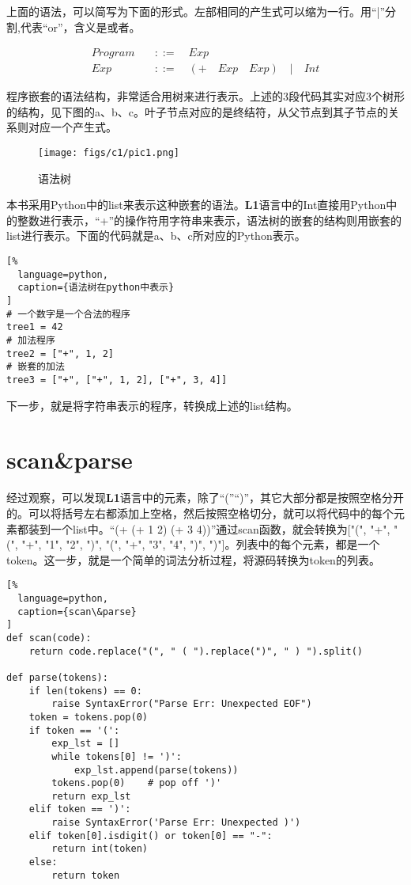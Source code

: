 上面的语法，可以简写为下面的形式。左部相同的产生式可以缩为一行。用“|”分割,代表“or”，含义是或者。

\begin{equation}
\begin{aligned}
  \label{eq:2}
   Program \quad &::= \quad Exp \\
   Exp \quad &::= \quad (+ \quad Exp \quad Exp) \quad | \quad Int
\end{aligned}
\end{equation}

程序嵌套的语法结构，非常适合用树来进行表示。上述的3段代码其实对应3个树形的结构，见下图的a、b、c。叶子节点对应的是终结符，从父节点到其子节点的关系则对应一个产生式。

\begin{figure}[ht]
\centering
\texttt{[image: figs/c1/pic1.png]}
\caption{语法树}
\label{fig:fig1}
\end{figure}

本书采用Python中的list来表示这种嵌套的语法。\textbf{L1}语言中的Int直接用Python中的整数进行表示，“+”的操作符用字符串来表示，语法树的嵌套的结构则用嵌套的list进行表示。下面的代码就是a、b、c所对应的Python表示。

\begin{lstlisting}[%
  language=python,
  caption={语法树在python中表示}
]
# 一个数字是一个合法的程序
tree1 = 42
# 加法程序
tree2 = ["+", 1, 2]
# 嵌套的加法
tree3 = ["+", ["+", 1, 2], ["+", 3, 4]]
\end{lstlisting}

下一步，就是将字符串表示的程序，转换成上述的list结构。


\section{scan\&parse}

经过观察，可以发现\textbf{L1}语言中的元素，除了“(”“)”，其它大部分都是按照空格分开的。可以将括号左右都添加上空格，然后按照空格切分，就可以将代码中的每个元素都装到一个list中。“(+ (+ 1 2) (+ 3 4))”通过scan函数，就会转换为["(", "+", "(", "+", "1", "2", ")", "(", "+", "3", "4", ")", ")"]。列表中的每个元素，都是一个token。这一步，就是一个简单的词法分析过程，将源码转换为token的列表。

\begin{lstlisting}[%
  language=python,
  caption={scan\&parse}
]
def scan(code):
    return code.replace("(", " ( ").replace(")", " ) ").split()

def parse(tokens):
    if len(tokens) == 0:
        raise SyntaxError("Parse Err: Unexpected EOF")
    token = tokens.pop(0)
    if token == '(':
        exp_lst = []
        while tokens[0] != ')':
            exp_lst.append(parse(tokens))
        tokens.pop(0)    # pop off ')'
        return exp_lst
    elif token == ')':
        raise SyntaxError('Parse Err: Unexpected )')
    elif token[0].isdigit() or token[0] == "-":
        return int(token)
    else:
        return token
\end{lstlisting}

